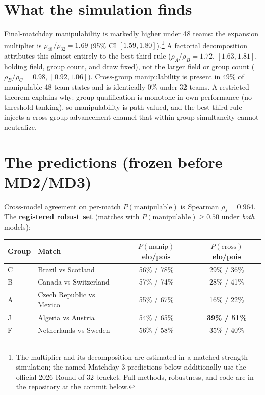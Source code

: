 \documentclass[11pt]{article}
\begin{document}
\section{What the simulation finds}
Final-matchday manipulability is markedly higher under 48 teams: the expansion multiplier is
$\rho_{48}/\rho_{32}=1.69$ (95\% CI $[1.59,1.80]$).\footnote{The multiplier and its decomposition are
estimated in a matched-strength simulation; the named Matchday-3 predictions below additionally use the
official 2026 Round-of-32 bracket. Full methods, robustness, and code are in the repository at the
commit below.} A factorial decomposition attributes this almost entirely to the best-third rule
($\rho_A/\rho_B=1.72$, $[1.63,1.81]$, holding field, group count, and draw fixed), not the larger field
or group count ($\rho_B/\rho_C=0.98$, $[0.92,1.06]$). Cross-group manipulability is present in $49\%$ of
manipulable 48-team states and is identically $0\%$ under 32 teams. A restricted theorem explains why:
group qualification is monotone in own performance (no threshold-tanking), so manipulability is
path-valued, and the best-third rule injects a cross-group advancement channel that within-group
simultaneity cannot neutralize.

\section{The predictions (frozen before MD2/MD3)}
Cross-model agreement on per-match $P(\text{manipulable})$ is Spearman $\rho_s = 0.964$. The
\textbf{registered robust set} (matches with $P(\text{manipulable})\ge 0.50$ under \emph{both} models):

\begin{center}
\begin{tabular}{llcc}
\toprule
Group & Match & $P(\text{manip})$ elo/pois & $P(\text{cross})$ elo/pois \\
\midrule
C & Brazil vs Scotland        & 56\% / 78\% & 29\% / 36\% \\
B & Canada vs Switzerland     & 57\% / 74\% & 28\% / 41\% \\
A & Czech Republic vs Mexico  & 55\% / 67\% & 16\% / 22\% \\
J & Algeria vs Austria        & 54\% / 65\% & \textbf{39\% / 51\%} \\
F & Netherlands vs Sweden     & 56\% / 58\% & 35\% / 40\% \\
\bottomrule
\end{tabular}
\end{center}
\end{document}
